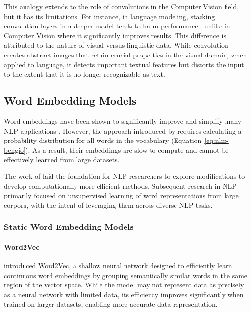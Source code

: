 This analogy extends to the role of convolutions in the Computer Vision field, but it has its limitations. For instance, in language modeling, stacking convolution layers in a deeper model tends to harm performance \citep{pham2016convolutional}, unlike in Computer Vision where it significantly improves results. This difference is attributed to the nature of visual versus linguistic data. While convolution creates abstract images that retain crucial properties in the visual domain, when applied to language, it detects important textual features but distorts the input to the extent that it is no longer recognizable as text.

\subsection{Word Embedding Models}

Word embeddings have been shown to significantly improve and simplify many \ac{NLP} applications \citep{collobert2011natural}. However, the approach introduced by \citet{bengio2000neural} requires calculating a probability distribution for all words in the vocabulary (Equation~\ref{eq:nlm-bengio}). As a result, their embeddings are slow to compute and cannot be effectively learned from large datasets. 

The work of \citet{bengio2000neural} laid the foundation for \ac{NLP} researchers to explore modifications to develop computationally more efficient methods. Subsequent research in \ac{NLP} primarily focused on unsupervised learning of word representations from large corpora, with the intent of leveraging them across diverse \ac{NLP} tasks.


\subsubsection{Static Word Embedding Models} 

\paragraph{Word2Vec}

\citet{mikolov2013efficient} introduced Word2Vec, a shallow neural network designed to efficiently learn continuous word embeddings by grouping semantically similar words in the same region of the vector space. While the model may not represent data as precisely as a neural network with limited data, its efficiency improves significantly when trained on larger datasets, enabling more accurate data representation. 

